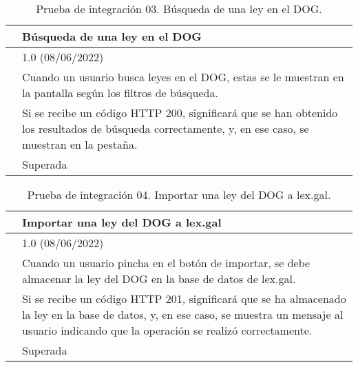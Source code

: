 \begin{table}[H]
\begin{center}
\begin{tabular}{|p{3cm}|p{10cm}|} \hline
\centering {\bf PI-03} & Búsqueda de una ley en el DOG  \\ \hline\hline
\centering {\bf Versión} & 1.0 (08/06/2022) \\ \hline
\centering {\bf Descripción} & Cuando un usuario busca leyes en el DOG, estas se le muestran en la pantalla según los filtros de búsqueda. \\ \hline
\centering {\bf Criterio de aceptación} & Si se recibe un código HTTP 200, significará que se han obtenido los resultados de búsqueda correctamente, y, en ese caso, se muestran en la pestaña. \\ \hline
\centering {\bf Estado} & Superada \\ \hline
\end{tabular}
\caption{Prueba de integración 03. Búsqueda de una ley en el DOG.}
\label{enlacePI3}
\end{center}
\end{table}

\begin{table}[H]
\begin{center}
\begin{tabular}{|p{3cm}|p{10cm}|} \hline
\centering {\bf PI-04} & Importar una ley del DOG a lex.gal  \\ \hline\hline
\centering {\bf Versión} & 1.0 (08/06/2022) \\ \hline
\centering {\bf Descripción} & Cuando un usuario pincha en el botón de importar, se debe almacenar la ley del DOG en la base de datos de lex.gal. \\ \hline
\centering {\bf Criterio de aceptación} & Si se recibe un código HTTP 201, significará que se ha almacenado la ley en la base de datos, y, en ese caso, se muestra un mensaje al usuario indicando que la operación se realizó correctamente. \\ \hline
\centering {\bf Estado} & Superada \\ \hline
\end{tabular}
\caption{Prueba de integración 04. Importar una ley del DOG a lex.gal.}
\label{enlacePI4}
\end{center}
\end{table}

